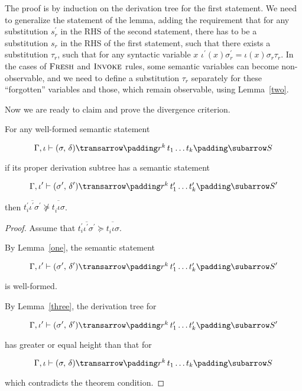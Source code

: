 The proof is by induction on the derivation tree for the first statement. We need to generalize the statement of the lemma, adding the requirement that 
for any substitution $s^\prime_r$ in the RHS of the second statement, there has to be a substitution $s_r$ in the RHS of the first statement,
such that there exists a substitution $\tau_r$, such that for any syntactic variable $x$ \mbox{$\iota^\prime(x) \sigma^\prime_r = \iota(x) \sigma_r \tau_r$}. 
In the cases of $\textsc{Fresh}$ and $\textsc{Invoke}$ rules, some semantic variables can become non-observable, and we need to define a substitution $\tau_r$ 
separately for these ``forgotten'' variables and those, which remain observable, using Lemma~\ref{two}.

Now we are ready to claim and prove the divergence criterion.

\setcounter{theorem}{0}
\begin{theorem}
\label{criterion}
\normalfont
For any well-formed semantic statement 

$$
\otrans{\Gamma,\iota}{(\sigma,\,\delta)}{r^k\,t_1\dots t_k}{S}
$$ 

if its proper derivation subtree has a semantic statement 

$$
\otrans{\Gamma,\iota^\prime}{(\sigma^\prime,\,\delta^\prime)}{r^k\,t^\prime_1\dots t^\prime_k}{S^\prime}
$$

then \mbox{$\overline{t^\prime_i \iota^\prime \sigma^\prime} \not \succeq \overline{t^{\phantom{\prime}}_i \iota \sigma}$}. 
\end{theorem}
\begin{proof}
Assume that \mbox{$\overline{t^\prime_i \iota^\prime \sigma^\prime}\succeq \overline{t^{\phantom{\prime}}_i \iota \sigma}$}. 

By Lemma~\ref{one}, the semantic statement

$$
\otrans{\Gamma,\iota^\prime}{(\sigma^\prime,\,\delta^\prime)}{r^k\,t^\prime_1\dots t^\prime_k}{S^\prime}
$$

\noindent is well-formed.

By Lemma~\ref{three}, the derivation tree for

$$
\otrans{\Gamma,\iota^\prime}{(\sigma^\prime,\,\delta^\prime)}{r^k\,t^\prime_1\dots t^\prime_k}{S^\prime}
$$

\noindent has greater or equal height than that for

$$
\otrans{\Gamma,\iota}{(\sigma,\,\delta)}{r^k\,t_1\dots t_k}{S}
$$ 

\noindent which contradicts the theorem condition.

\end{proof}

